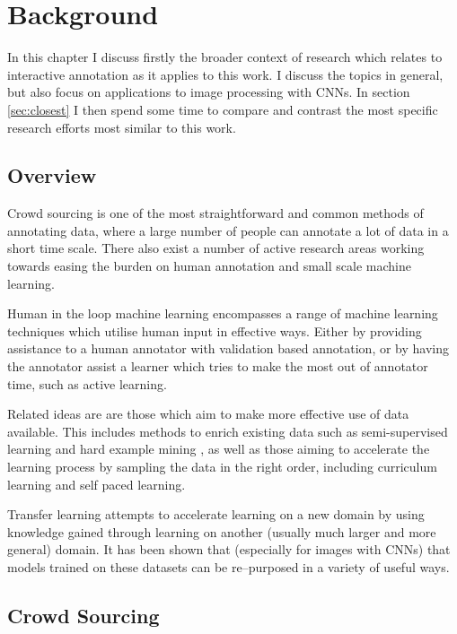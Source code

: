 


\chapter{Background}

In this chapter I discuss firstly the broader context of research which relates to interactive annotation as it applies to this work. I discuss the topics in general, but also focus on applications to image processing with \gls{CNN}s. In section \ref{sec:closest} I then spend some time to compare and contrast the most specific research efforts most similar to this work.


\section {Overview}

Crowd sourcing  is one of the most straightforward and common methods of annotating data, where a large number of people can annotate a lot of data in a short time scale. There also exist a number of active research areas working towards easing the burden on human annotation and small scale machine learning. 

Human in the loop machine learning encompasses a range of machine learning techniques which utilise human input in effective ways. Either by providing assistance to a human annotator with validation based annotation, or by having the annotator assist a learner which tries to make the most out of annotator time, such as active learning.

Related ideas are are those which aim to make more effective use of data available. This includes methods to enrich existing data such as semi-supervised learning and hard example mining \cite{Jin2018, Yu2018, Canevet2014}, as well as those aiming to accelerate the learning process by sampling the data in the right order, including curriculum learning and self paced learning.

Transfer learning attempts to accelerate learning on a new domain by using knowledge gained through learning on another (usually much larger and more general) domain. It has been shown that (especially for images with \gls{CNN}s) that models trained on these datasets can be re--purposed in a variety of useful ways.


\section {Crowd Sourcing}

